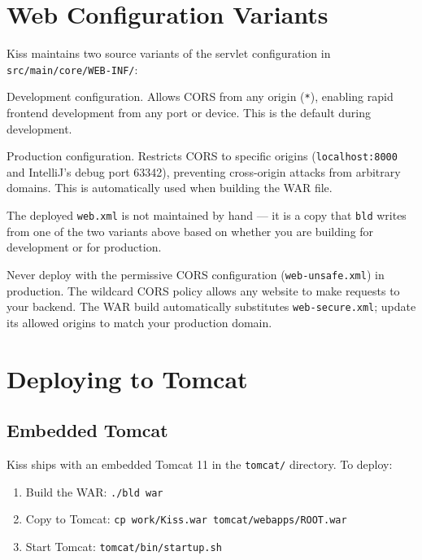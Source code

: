 \section{Web Configuration Variants}
\label{sec:deploy-webxml}

Kiss maintains two source variants of the servlet configuration in \texttt{src/main/core/WEB-INF/}:

\begin{description}[style=nextline]
  \item[\texttt{web-unsafe.xml}] Development configuration.  Allows CORS from any origin (\texttt{*}), enabling rapid frontend development from any port or device.  This is the default during development.

  \item[\texttt{web-secure.xml}] Production configuration.  Restricts CORS to specific origins (\texttt{localhost:8000} and IntelliJ's debug port 63342), preventing cross-origin attacks from arbitrary domains.  This is automatically used when building the WAR file.
\end{description}

\noindent
The deployed \texttt{web.xml} is not maintained by hand --- it is a copy that \texttt{bld} writes from one of the two variants above based on whether you are building for development or for production.

\begin{warnbox}
Never deploy with the permissive CORS configuration (\texttt{web-unsafe.xml}) in production.  The wildcard CORS policy allows any website to make requests to your backend.  The WAR build automatically substitutes \texttt{web-secure.xml}; update its allowed origins to match your production domain.
\end{warnbox}

\section{Deploying to Tomcat}
\label{sec:deploy-tomcat}

\subsection{Embedded Tomcat}

Kiss ships with an embedded Tomcat 11 in the \texttt{tomcat/} directory.  To deploy:

\begin{enumerate}
  \item Build the WAR: \texttt{./bld war}
  \item Copy to Tomcat: \texttt{cp work/Kiss.war tomcat/webapps/ROOT.war}
  \item Start Tomcat: \texttt{tomcat/bin/startup.sh}
\end{enumerate}


